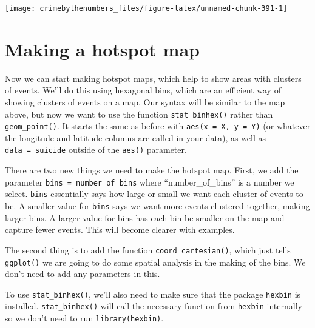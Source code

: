 \documentclass[
  a4paper,
]{krantz}
\makeatletter
\newenvironment{Shaded}{\begin{snugshade}}{\end{snugshade}}
\newcommand{\AttributeTok}[1]{\textcolor[rgb]{0.61,0.61,0.61}{#1}}
\newcommand{\FunctionTok}[1]{\textcolor[rgb]{0,0,0}{#1}}
\newcommand{\NormalTok}[1]{#1}
\newcommand{\SpecialCharTok}[1]{\textcolor[rgb]{0,0,0}{#1}}
\newcommand{\StringTok}[1]{\textcolor[rgb]{0.5,0.5,0.5}{#1}}
\newenvironment{kframe}{%
\medskip{}
\setlength{\fboxsep}{.8em}
 \def\at@end@of@kframe{}%
 \ifinner\ifhmode%
  \def\at@end@of@kframe{\end{minipage}}%
  \begin{minipage}{\columnwidth}%
 \fi\fi%
 \def\FrameCommand##1{\hskip\@totalleftmargin \hskip-\fboxsep
 \colorbox{shadecolor}{##1}\hskip-\fboxsep
     \hskip-\linewidth \hskip-\@totalleftmargin \hskip\columnwidth}%
 \MakeFramed {\advance\hsize-\width
   \@totalleftmargin\z@ \linewidth\hsize
   \@setminipage}}%
 {\par\unskip\endMakeFramed%
 \at@end@of@kframe}
\renewenvironment{Shaded}{\begin{kframe}}{\end{kframe}}
\makeatother
\begin{document}
\begin{Shaded}
\end{Shaded}

\begin{center}\texttt{[image: crimebythenumbers\_files/figure-latex/unnamed-chunk-391-1]} \end{center}

\hypertarget{making-a-hotspot-map}{%
\section{Making a hotspot map}\label{making-a-hotspot-map}}

Now we can start making hotspot maps, which help to show
areas with clusters of events. We'll do this using hexagonal
bins, which are an efficient way of showing clusters of
events on a map. Our syntax will be similar to the map
above, but now we want to use the function
\texttt{stat\_binhex()} rather than \texttt{geom\_point()}.
It starts the same as before with
\texttt{aes(x\ =\ X,\ y\ =\ Y)} (or whatever the longitude
and latitude columns are called in your data), as well as
\texttt{data\ =\ suicide} outside of the \texttt{aes()}
parameter.

There are two new things we need to make the hotspot map.
First, we add the parameter
\texttt{bins\ =\ number\_of\_bins} where
``number\_of\_bins'' is a number we select. \texttt{bins}
essentially says how large or small we want each cluster of
events to be. A smaller value for \texttt{bins} says we want
more events clustered together, making larger bins. A larger
value for bins has each bin be smaller on the map and
capture fewer events. This will become clearer with
examples.

The second thing is to add the function
\texttt{coord\_cartesian()}, which just tells
\texttt{ggplot()} we are going to do some spatial analysis
in the making of the bins. We don't need to add any
parameters in this.

To use \texttt{stat\_binhex()}, we'll also need to make sure
that the package \texttt{hexbin} is installed.
\texttt{stat\_binhex()} will call the necessary function
from \texttt{hexbin} internally so we don't need to run
\texttt{library(hexbin)}.
\end{document}
